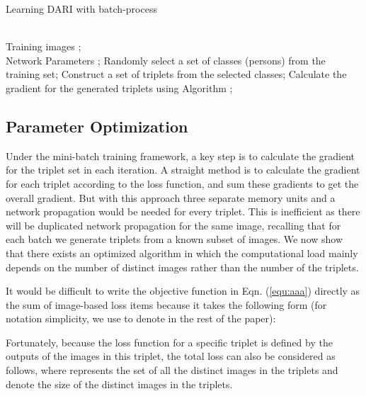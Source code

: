 \documentclass[letterpaper]{article}
\begin{document}
\renewcommand{\algorithmicrequire}{ \textbf{Input:}} \renewcommand{\algorithmicensure}{ \textbf{Output:}} \begin{small}
\vspace{-3mm}
\begin{algorithm}[htb]
\caption{Learning DARI with batch-process}
\label{alg:batchTraining}
\begin{algorithmic}[1]
\REQUIRE ~~\\
   Training images ;
\ENSURE ~~\\
	Network Parameters 
\WHILE    {}
\STATE ;
\STATE Randomly select a set of classes (persons) from the training set;
\STATE Construct a set of triplets from the selected classes;
\STATE Calculate the gradient  for the generated triplets using Algorithm ;
\STATE 
\ENDWHILE

\end{algorithmic}
\end{algorithm}
\end{small}


\subsection{Parameter Optimization}

Under the mini-batch training framework, a key step is to calculate the gradient for the triplet set in each iteration. A straight method is to calculate the gradient for each triplet according to the loss function, and sum these gradients to get the overall gradient. But with this approach three separate memory units and a network propagation would be needed for every triplet. This is inefficient as there will be duplicated network propagation for the same image, recalling that for each batch we generate triplets from a known subset of images. We now show that there exists an optimized algorithm in which the computational load mainly depends on the number of distinct images rather than the number of the triplets.

It would be difficult to write the objective function in Eqn. (\ref{equ:aaa}) directly as the sum of image-based loss items because it takes the following form (for notation simplicity, we use  to denote  in the rest of the paper):
\begin{small}

\end{small}
Fortunately, because the loss function for a specific triplet is defined by the outputs of the images in this triplet, the total loss can also be considered as follows, where  represents the set of all the distinct images in the triplets and  denote the size of the distinct images in the triplets.
\begin{small}

\end{small}
\end{document}
